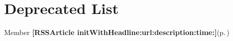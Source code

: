 \section{Deprecated List}\label{deprecated}
\label{deprecated__deprecated000001}
 \begin{description}
\item[Member {\bf \mbox{[}RSSArticle init\-With\-Headline:url:description:time:\mbox{]}}{\rm (p.\,\pageref{interfaceRSSArticle_a2})} ]

\end{description}

